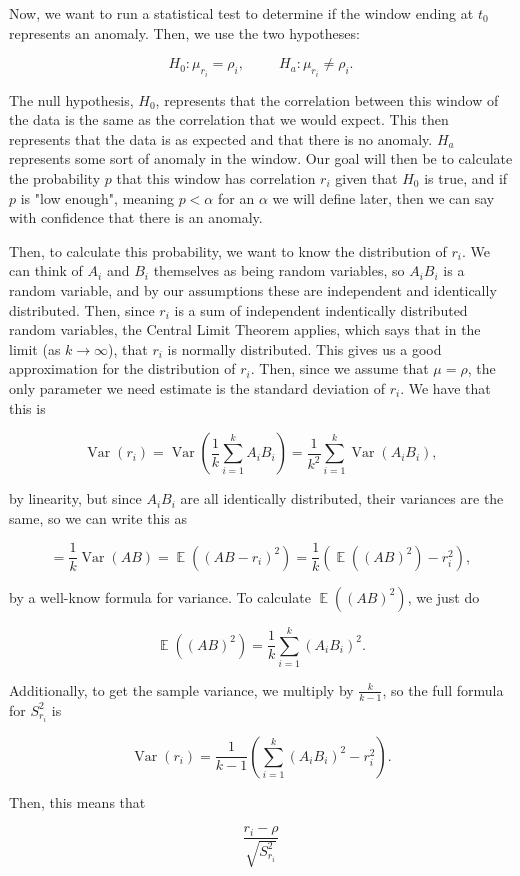 \documentclass{article}
\DeclareMathOperator{\E}{\mathbb{E}}
\DeclareMathOperator{\Var}{\mathrm{Var}}
\begin{document}
Now, we want to run a statistical test to determine if the window ending at $t_0$ represents an anomaly. Then, we use the two hypotheses:

$$H_0: \mu_{r_i} = \rho_i,
~~~~~~~~~~~
H_a: \mu_{r_i} \ne \rho_i.$$

The null hypothesis, $H_0$, represents that the correlation between this window of the data is the same as the correlation that we would expect. This then represents that the data is as expected and that there is no anomaly. $H_a$ represents some sort of anomaly in the window. Our goal will then be to calculate the probability $p$ that this window has correlation $r_i$ given that $H_0$ is true, and if $p$ is "low enough", meaning $p < \alpha$ for an $\alpha$ we will define later, then we can say with confidence that there is an anomaly.

Then, to calculate this probability, we want to know the distribution of $r_i$. We can think of $A_i$ and $B_i$ themselves as being random variables, so $A_i B_i$ is a random variable, and by our assumptions these are independent and identically distributed. Then, since $r_i$ is a sum of independent indentically distributed random variables, the Central Limit Theorem applies, which says that in the limit (as $k \to \infty$), that $r_i$ is normally distributed. This gives us a good approximation for the distribution of $r_i$. Then, since we assume that $\mu = \rho$, the only parameter we need estimate is the standard deviation of $r_i$. We have that this is

$$\Var(r_i) = \Var(\frac{1}{k} \sum_{i = 1}^k A_i B_i) = \frac{1}{k^2} \sum_{i =1}^k \Var(A_i B_i),$$

by linearity, but since $A_i B_i$ are all identically distributed, their variances are the same, so we can write this as

$$ = \frac{1}{k} \Var(AB) = \E((AB - r_i)^2) = \frac{1}{k}\left(\E((AB)^2) - r_i^2\right),$$

by a well-know formula for variance. To calculate $\E((AB)^2)$, we just do

$$\E((AB)^2) = \frac{1}{k} \sum_{i=1}^k (A_i B_i)^2.$$

Additionally, to get the sample variance, we multiply by $\frac{k}{k-1}$, so the full formula for $S^2_{r_i}$ is

$$\Var(r_i) = \frac{1}{k-1}\left(\sum_{i=1}^k (A_i B_i)^2 - r_i^2\right).$$

Then, this means that

$$\frac{r_i - \rho}{\sqrt{S^2_{r_i}}}$$
\end{document}
